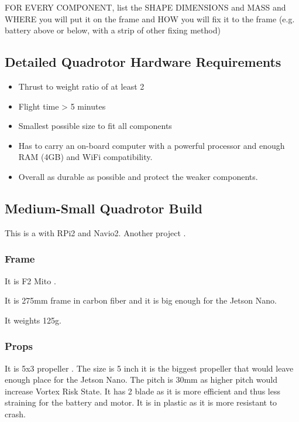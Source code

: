 FOR EVERY COMPONENT, list the SHAPE DIMENSIONS and MASS and WHERE you will put it on the frame and HOW you will fix it to the frame (e.g. battery above or below, with a strip of other fixing method)

\subsection{Detailed Quadrotor Hardware Requirements}
\begin{itemize}
    \item Thrust to weight ratio of at least 2
    \item Flight time > 5 minutes
    \item Smallest possible size to fit all components
    \item Has to carry an on-board computer with a powerful processor and enough RAM (4GB) and WiFi compatibility.
    \item Overall as durable as possible and protect the weaker components.
\end{itemize}

\subsection{Medium-Small Quadrotor Build}


This is a \cite{hackaday_navio} with RPi2 and Navio2.
Another project \cite{instructables_navio}.

\subsubsection{Frame}
It is F2 Mito \cite{bangood_f2_mito}.

It is 275mm frame in carbon fiber and it is big enough for the Jetson Nano.

It weights 125g.

\subsubsection{Props}
It is 5x3 propeller \cite{bangood_propeller}. The size is 5 inch it is the biggest propeller that would leave enough place for the Jetson Nano. The pitch is 30mm as higher pitch would increase Vortex Risk State. It has 2 blade as it is more efficient and thus less straining for the battery and motor. It is in plastic as it is more resistant to crash.


